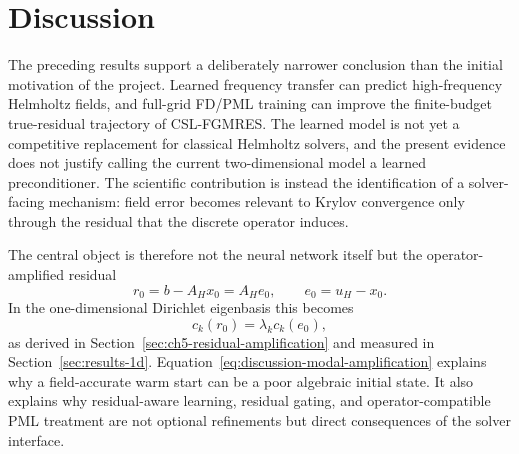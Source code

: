 %

\chapter{Discussion}
\label{chapter:discussion}

The preceding results support a deliberately narrower conclusion than the
initial motivation of the project. Learned frequency transfer can predict
high-frequency Helmholtz fields, and full-grid FD/PML training can improve the
finite-budget true-residual trajectory of CSL-FGMRES. The learned model is not
yet a competitive replacement for classical Helmholtz solvers, and the present
evidence does not justify calling the current two-dimensional model a learned
preconditioner. The scientific contribution is instead the identification of a
solver-facing mechanism: field error becomes relevant to Krylov convergence
only through the residual that the discrete operator induces.

The central object is therefore not the neural network itself but the
operator-amplified residual
\begin{equation}
    r_0 = b - A_H x_0 = A_H e_0,
    \qquad
    e_0 = u_H - x_0 .
    \label{eq:discussion-error-residual}
\end{equation}
In the one-dimensional Dirichlet eigenbasis this becomes
\begin{equation}
    c_k(r_0) = \lambda_k c_k(e_0),
    \label{eq:discussion-modal-amplification}
\end{equation}
as derived in Section~\ref{sec:ch5-residual-amplification} and measured in
Section~\ref{sec:results-1d}. Equation~\eqref{eq:discussion-modal-amplification}
explains why a field-accurate warm start can be a poor algebraic initial
state. It also explains why residual-aware learning, residual gating, and
operator-compatible PML treatment are not optional refinements but direct
consequences of the solver interface.

